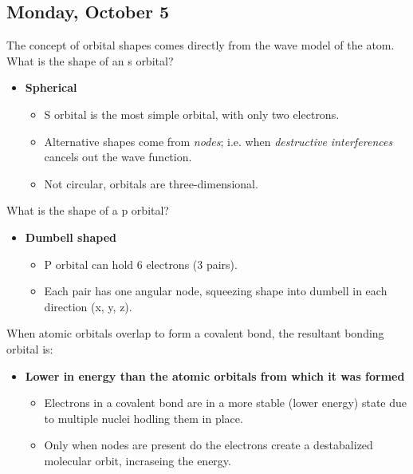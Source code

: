 \documentclass[12pt,a4paper]{article}
\begin{document}
\subsection{Monday, October 5}
\begin{enumerate}
    {\color{G-Moon}\item The concept of orbital shapes comes directly from the wave model of the atom.  What is the shape of an s orbital?}
        \begin{itemize}
            \item {\color{o-Sun}\textbf{Spherical}}
                \begin{itemize}
                    \item S orbital is the most simple orbital, with only two electrons. 
                    \item Alternative shapes come from \textit{nodes}; i.e. when \textit{destructive interferences} cancels out the wave function.
                    \item Not circular, orbitals are three-dimensional.
                \end{itemize}
        \end{itemize}
    {\color{G-Moon}\item What is the shape of a p orbital?}
        \begin{itemize}
            \item {\color{o-Sun}\textbf{Dumbell shaped}}
                \begin{itemize}
                    \item P orbital can hold 6 electrons (3 pairs).
                    \item Each pair has one angular node, squeezing shape into dumbell in each direction (x, y, z).
                \end{itemize}
        \end{itemize}
    {\color{G-Moon}\item When atomic orbitals overlap to form a covalent bond, the resultant bonding orbital is:}
        \begin{itemize}
            \item {\color{o-Sun}\textbf{Lower in energy than the atomic orbitals from which it was formed}}
                \begin{itemize}
                    \item Electrons in a covalent bond are in a more stable (lower energy) state due to multiple nuclei hodling them in place.
                    \item Only when nodes are present do the electrons create a destabalized molecular orbit, incraseing the energy.

\end{itemize}
\end{itemize}
\end{enumerate}
\end{document}
